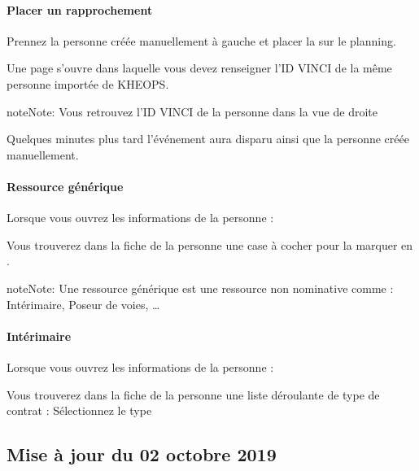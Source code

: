 \documentclass[letterpaper,10pt,english]{sphinxmanual}
\begin{document}
\paragraph{Placer un rapprochement}
\label{\detokenize{fonctionnalitees/vbadge:placer-un-rapprochement}}
Prennez la personne créée manuellement à gauche et placer la sur le planning. 

Une page s’ouvre dans laquelle vous devez renseigner l’ID VINCI de la même personne importée de KHEOPS.

\begin{sphinxadmonition}{note}{Note:}
Vous retrouvez l’ID VINCI de la personne dans la vue de droite
\end{sphinxadmonition}

Quelques minutes plus tard l’événement aura disparu ainsi que la personne créée manuellement.


\paragraph{Ressource générique}
\label{\detokenize{fonctionnalitees/vbadge:ressource-generique}}
Lorsque vous ouvrez les informations de la personne : 

Vous trouverez dans la fiche de la personne une case à cocher pour la marquer en .

\begin{sphinxadmonition}{note}{Note:}
Une ressource générique est une ressource non nominative comme : Intérimaire, Poseur de voies, …
\end{sphinxadmonition}


\paragraph{Intérimaire}
\label{\detokenize{fonctionnalitees/vbadge:interimaire}}
Lorsque vous ouvrez les informations de la personne : 

Vous trouverez dans la fiche de la personne une liste déroulante de type de contrat : Sélectionnez le type 


\subsection{Mise à jour du 02 octobre 2019}
\label{\detokenize{maj/maj_30092019:mise-a-jour-du-02-octobre-2019}}\label{\detokenize{maj/maj_30092019::doc}}
\end{document}
